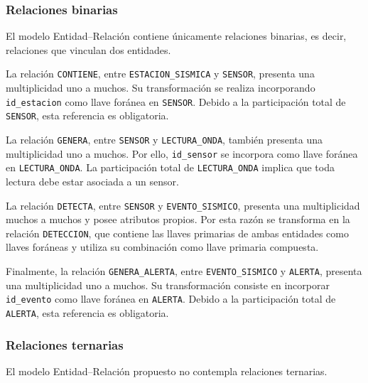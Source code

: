 \documentclass[12pt,a4paper]{article}
\begin{document}

\subsubsection{Relaciones binarias}

El modelo Entidad--Relación contiene únicamente relaciones binarias, es decir, relaciones que vinculan dos entidades.

La relación \texttt{CONTIENE}, entre \texttt{ESTACION\_\allowbreak{}SISMICA} y \texttt{SENSOR}, presenta una multiplicidad uno a muchos. Su transformación se realiza incorporando \texttt{id\_\allowbreak{}estacion} como llave foránea en \texttt{SENSOR}. Debido a la participación total de \texttt{SENSOR}, esta referencia es obligatoria.

La relación \texttt{GENERA}, entre \texttt{SENSOR} y \texttt{LECTURA\_\allowbreak{}ONDA}, también presenta una multiplicidad uno a muchos. Por ello, \texttt{id\_\allowbreak{}sensor} se incorpora como llave foránea en \texttt{LECTURA\_\allowbreak{}ONDA}. La participación total de \texttt{LECTURA\_\allowbreak{}ONDA} implica que toda lectura debe estar asociada a un sensor.

La relación \texttt{DETECTA}, entre \texttt{SENSOR} y \texttt{EVENTO\_\allowbreak{}SISMICO}, presenta una multiplicidad muchos a muchos y posee atributos propios. Por esta razón se transforma en la relación \texttt{DETECCION}, que contiene las llaves primarias de ambas entidades como llaves foráneas y utiliza su combinación como llave primaria compuesta.

Finalmente, la relación \texttt{GENERA\_\allowbreak{}ALERTA}, entre \texttt{EVENTO\_\allowbreak{}SISMICO} y \texttt{ALERTA}, presenta una multiplicidad uno a muchos. Su transformación consiste en incorporar \texttt{id\_\allowbreak{}evento} como llave foránea en \texttt{ALERTA}. Debido a la participación total de \texttt{ALERTA}, esta referencia es obligatoria.


\subsubsection{Relaciones ternarias}

El modelo Entidad--Relación propuesto no contempla relaciones ternarias.
\end{document}
